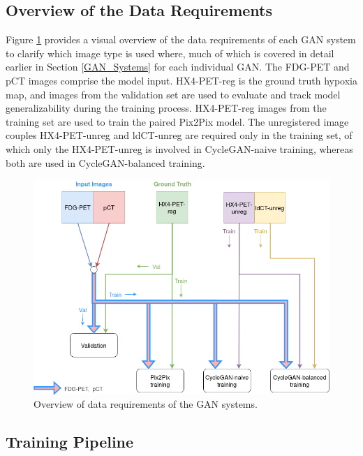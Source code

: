 \subsection{Overview of the Data Requirements}
\label{data_requirements}
Figure \ref{fig:which_images_where} provides a visual overview of the data requirements of each GAN system to clarify which image type is used where, much of which is covered in detail earlier in Section \ref{GAN_Systems} for each individual GAN. The FDG-PET and pCT images comprise the model input. HX4-PET-reg is the ground truth hypoxia map, and images from the validation set are used to evaluate and track model generalizability during the training process. HX4-PET-reg images from the training set are used to train the paired Pix2Pix model. The unregistered image couples HX4-PET-unreg and ldCT-unreg are required only in the training set, of which only the HX4-PET-unreg is involved in CycleGAN-naive training, whereas both are used in CycleGAN-balanced training.

\begin{figure}[h!]
    \centering
    \includegraphics[width=0.8\linewidth]{figures/Data/which_images_where.png}
    \caption{Overview of data requirements of the GAN systems.}
    \label{fig:which_images_where}
\end{figure}


\subsection{Training Pipeline}
\label{training_pipeline}

